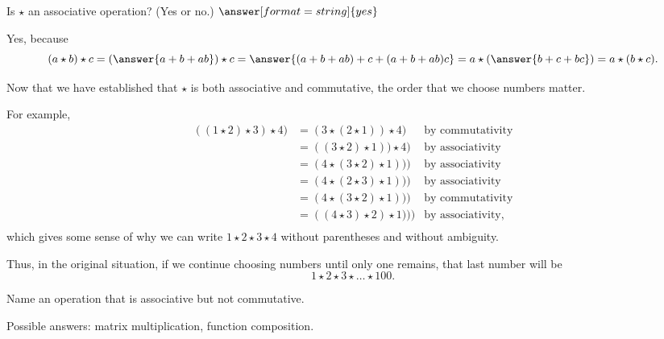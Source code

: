 \documentclass{ximera}
\begin{document}
\begin{problem}
Is $\star$ an associative operation?  (Yes or no.)  $\answer[format=string]{yes}$

\begin{explanation}
Yes, because 
\[
(a\star b)\star c =  \left(\answer{a+b+ab}\right)\star c = \answer{(a+b+ab)+c + (a+b+ab)c} 
 = a\star \left(\answer{b+c+bc}\right) = a \star(b\star c). 
 \]
\begin{question}
Now that we have established that $\star$ is both associative 
and commutative, the order that we choose numbers  matter.  

For example, 
\begin{align*}
((1\star 2)\star 3 )\star 4) &= (3\star (2\star 1))\star 4) &  \text{by commutativity} \\
                                        &= ((3\star 2)\star 1))\star 4) & \text{by associativity}  \\
                                        &= (4\star (3\star 2)\star 1))) & \text{by associativity}  \\
                                        &= (4\star (2\star 3)\star 1))) & \text{by associativity}  \\
                                        &= (4\star (3\star 2)\star 1))) & \text{by commutativity}  \\
                                        &= ((4\star 3)\star 2)\star 1))) & \text{by associativity},  \\
\end{align*}
which gives some sense of why we can write $1\star 2 \star 3 \star 4$ without parentheses and without ambiguity.  

Thus, in the original situation, if we continue choosing numbers until only one remains, that last number will be 
\[
1\star 2\star 3\star \dots \star 100. 
\]
\end{question}
\end{explanation}
\end{problem}

\begin{problem}
Name an operation that is associative but not commutative.  
\begin{freeResponse}
\begin{hint}
Possible answers: matrix multiplication, function composition.  
\end{hint}
\end{freeResponse}
\end{problem}
\end{document}
